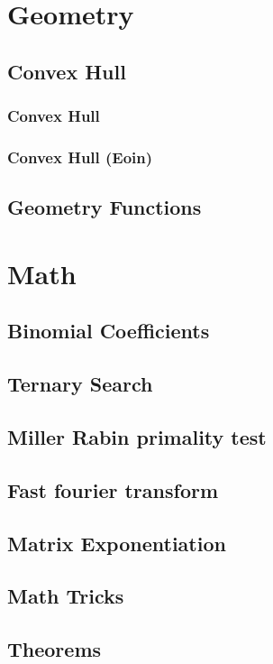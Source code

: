 \documentclass[twocolumn, landscape]{report}
\begin{document}
    \chapter*{Geometry}
        \section{Convex Hull}
            \subsection{Convex Hull}
            
            \subsection{Convex Hull (Eoin)}
            
        \section{Geometry Functions}
            
            


    \chapter*{Math}
        \section{Binomial Coefficients}
        
        \section{Ternary Search}
        
        \section{Miller Rabin primality test}
        
        \section{Fast fourier transform}
        
        \section{Matrix Exponentiation}
        
        \section{Math Tricks}
        
        \section{Theorems}
        
\end{document}
